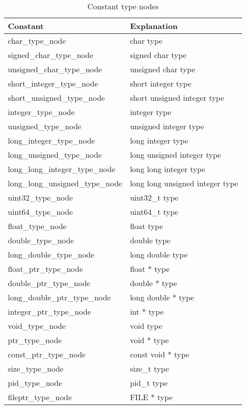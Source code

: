 \documentclass[11pt]{article}
\begin{document}
\begin{table}
\begin{center}
\begin{tabular}{|l|l|}
\hline 
Constant & Explanation \\ \hline
char\_type\_node & char type \\
signed\_char\_type\_node & signed char type \\
unsigned\_char\_type\_node & unsigned char type \\
short\_integer\_type\_node & short integer type \\
short\_unsigned\_type\_node & short unsigned integer type \\
integer\_type\_node & integer type \\
unsigned\_type\_node & unsigned integer type \\
long\_integer\_type\_node & long integer type \\
long\_unsigned\_type\_node & long unsigned integer type\\
long\_long\_integer\_type\_node & long long integer type \\
long\_long\_unsigned\_type\_node & long long unsigned integer type\\
uint32\_type\_node & uint32\_t type \\
uint64\_type\_node & uint64\_t type \\
float\_type\_node & float type \\
double\_type\_node & double type\\
long\_double\_type\_node & long double type\\
float\_ptr\_type\_node & float * type \\
double\_ptr\_type\_node & double * type\\
long\_double\_ptr\_type\_node & long double * type\\
integer\_ptr\_type\_node & int * type\\
void\_type\_node & void type\\
ptr\_type\_node & void * type \\
const\_ptr\_type\_node & const void * type \\
size\_type\_node & size\_t type \\
pid\_type\_node & pid\_t type \\
fileptr\_type\_node & FILE * type\\
\hline
\end{tabular}
\end{center}
\caption{Constant type nodes}
\label{tab:constant-type-nodes}
\end{table}
\end{document}
